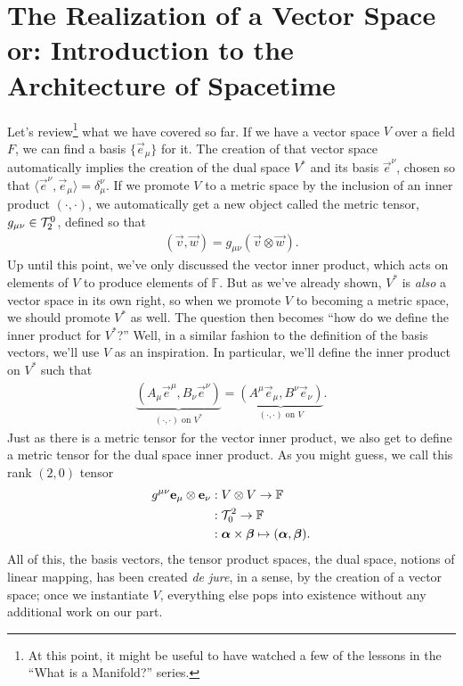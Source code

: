 \chapter{The Realization of a Vector Space or: Introduction to the Architecture of Spacetime}
Let's review\footnote{At this point, it might be useful to have watched a few of the lessons in the ``What is a Manifold?'' series.} what we have covered so far.
If we have a vector space $V$ over a field $F$, we can find a basis $\{\vec{e}_\mu\}$ for it.
The creation of that vector space automatically implies the creation of the dual space $V^*$ and its basis $\vec{e}^\nu$, chosen so that $\langle \vec{e}^\nu, \vec{e}_\mu \rangle = \delta^\nu_\mu$.
If we promote $V$ to a metric space by the inclusion of an inner product $(\cdot,\cdot)$, we automatically get a new object called the metric tensor, $g_{\mu\nu} \in \mathcal{T}^0_2$, defined so that
\begin{align*}
    (\vec{v},\vec{w}) = g_{\mu\nu}(\vec{v} \otimes \vec{w}).
\end{align*}
Up until this point, we've only discussed the vector inner product, which acts on elements of $V$ to produce elements of $\mathbb{F}$.
But as we've already shown, $V^*$ is \emph{also} a vector space in its own right, so when we promote $V$ to becoming a metric space, we should promote $V^*$ as well.
The question then becomes ``how do we define the inner product for $V^*$?''
Well, in a similar fashion to the definition of the basis vectors, we'll use $V$ as an inspiration.
In particular, we'll define the inner product on $V^*$ such that
\begin{align*}
    \underbrace{(A_\mu \vec{e}^\mu, B_\nu \vec{e}^\nu)}_{\text{$(\cdot, \cdot)$ on $V^*$}} = \underbrace{(A^\mu \vec{e}_\mu, B^\nu \vec{e}_\nu)}_{\text{$(\cdot, \cdot)$ on $V$}}.
\end{align*}
Just as there is a metric tensor for the vector inner product, we also get to define a metric tensor for the dual space inner product.
As you might guess, we call this rank $(2,0)$ tensor
\begin{align*}
    g^{\mu\nu} \vb{e}_\mu \otimes \vb{e}_\nu &: V \otimes V \to \mathbb{F} \\
               &: \mathcal{T}^2_0 \to \mathbb{F} \\
               &: \vb*{\alpha} \times \vb*{\beta} \mapsto (\vb*{\alpha},\vb*{\beta}).
\end{align*}
All of this, the basis vectors, the tensor product spaces, the dual space, notions of linear mapping, has been created \emph{de jure}, in a sense, by the creation of a vector space; once we instantiate $V$, everything else pops into existence without any additional work on our part.
